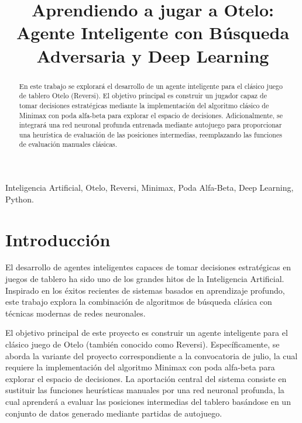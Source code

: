 \documentclass[conference]{IEEEtran}
\begin{document}
\title{Aprendiendo a jugar a Otelo: Agente Inteligente con Búsqueda Adversaria y Deep Learning}

\author{
}

\maketitle

\begin{abstract}
En este trabajo se explorará el desarrollo de un agente inteligente para el clásico juego de tablero Otelo (Reversi). 
El objetivo principal es construir un jugador capaz de tomar decisiones estratégicas mediante la implementación del 
algoritmo clásico de Minimax con poda alfa-beta para explorar el espacio de decisiones. Adicionalmente, se integrará 
una red neuronal profunda entrenada mediante autojuego para proporcionar una heurística de evaluación de las posiciones 
intermedias, reemplazando las funciones de evaluación manuales clásicas.
\end{abstract}

\begin{IEEEkeywords}
Inteligencia Artificial, Otelo, Reversi, Minimax, Poda Alfa-Beta, Deep Learning, Python.
\end{IEEEkeywords}

\section{Introducción}
El desarrollo de agentes inteligentes capaces de tomar decisiones estratégicas en juegos de tablero ha sido uno 
de los grandes hitos de la Inteligencia Artificial. Inspirado en los éxitos recientes de sistemas basados en 
aprendizaje profundo, este trabajo explora la combinación de algoritmos de búsqueda clásica con técnicas modernas de redes neuronales.

El objetivo principal de este proyecto es construir un agente inteligente para el clásico juego de Otelo (también conocido como Reversi). 
Específicamente, se aborda la variante del proyecto correspondiente a la convocatoria de julio, la cual requiere la implementación del 
algoritmo Minimax con poda alfa-beta para explorar el espacio de decisiones. La aportación central del sistema consiste en sustituir las 
funciones heurísticas manuales por una red neuronal profunda, la cual aprenderá a evaluar las posiciones intermedias del tablero basándose 
en un conjunto de datos generado mediante partidas de autojuego.
\end{document}
